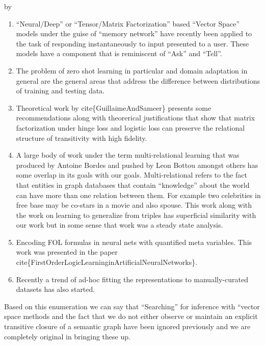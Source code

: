 \documentclass[12pt]{exam} %
\makeatletter
\renewcommand{\cite}[1]{cite\{#1\}}
\def\SetTotalwidth{\advance\linewidth by \@totalleftmargin
\@totalleftmargin=0pt}
\newcommand{\answer}[1]{
\ifprintanswers
\SetTotalwidth
  \begin{solution}[0in]#1\end{solution}
\else \fi
}
\makeatother
\begin{document}
\begin{questions}
  \answer{
    \begin{enumerate}
    \item ``Neural/Deep'' or ``Tensor/Matrix Factorization'' based
      ``Vector Space'' models under the guise of ``memory network''
      have recently been applied to the task of responding
      instantaneously to input presented to a user. These models have
      a component that is reminiscent of ``Ask'' and ``Tell''.
    \item The problem of zero shot learning in particular and domain
      adaptation in general are the general areas that address the
      difference between distributions of training and testing data.
    \item Theoretical work by \cite{GuillaimeAndSameer} presents some
      recommendations along with theorerical justifications that show
      that matrix factorization under hinge loss and logistic loss can
      preserve the relational structure of transitivity with high
      fidelity.
    \item A large body of work under the term multi-relational
      learning that was produced by Antoine Bordes and pushed by Leon
      Bottou amongst others has some overlap in its goals with our
      goals. Multi-relational refers to the fact that entities in
      graph databases that contain ``knowledge'' about the world can
      have more than one relation between them. For example two
      celebrities in free base may be co-stars in a movie and also
      spouse. This work along with the work on learning to generalize
      from triples has superficial similarity with our work but in
      some sense that work was a steady state analysis.
    \item Encoding FOL formulas in neural nets with quantified meta
      variables. This work was presented in the paper
      \cite{FirstOrderLogicLearninginArtificialNeuralNetworks}.
    \item Recently a trend of ad-hoc fitting the representations to
      manually-curated datasets has also started.
    \end{enumerate}

    Based on this enumeration we can say that ``Searching'' for
    inference with ``vector space methods and the fact that we do not
    either observe or maintain an explicit transitive closure of a
    semantic graph have been ignored previously and we are completely
    original in bringing these up.  }


\end{questions}
\end{document}
